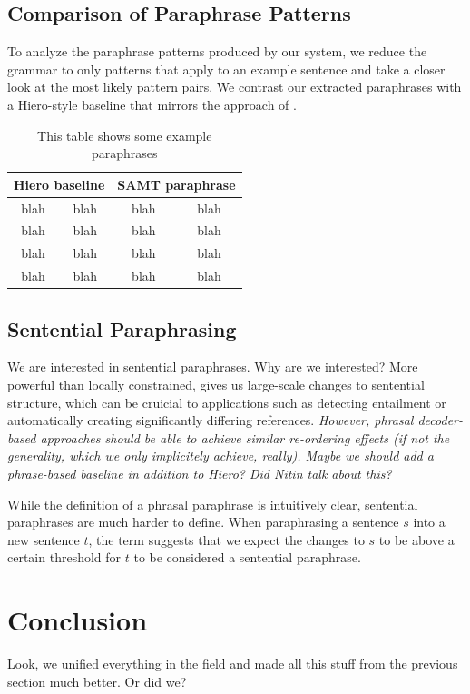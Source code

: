 \documentclass[11pt]{article}
\begin{document}
\subsection{Comparison of Paraphrase
  Patterns} \label{pattern_comparison}

To analyze the paraphrase patterns produced by our system, we reduce
the grammar to only patterns that apply to an example sentence and
take a closer look at the most likely pattern pairs. We contrast our
extracted paraphrases with a Hiero-style baseline that mirrors the
approach of . 

\begin{table}[ht]
\begin{center}
\begin{tabular}{|c|c|c|c|}
  \hline
  \multicolumn{2}{|c|}{Hiero baseline} & \multicolumn{2}{c|}{SAMT
    paraphrase} \\
  \hline
  blah & blah & blah & blah \\
  blah & blah & blah & blah \\
  blah & blah & blah & blah \\
  blah & blah & blah & blah \\
  \hline
\end{tabular}
\end{center}
\caption{This table shows some example paraphrases}
\end{table}


\subsection{Sentential Paraphrasing} \label{sentential_paraphrasing}

We are interested in sentential paraphrases. Why are we interested?
More powerful than locally constrained, gives us large-scale changes
to sentential structure, which can be cruicial to applications such as
detecting entailment or automatically creating significantly differing
references. \emph{However, phrasal decoder-based approaches should be
  able to achieve similar re-ordering effects (if not the generality,
  which we only implicitely achieve, really). Maybe we should add a
  phrase-based baseline in addition to Hiero? Did Nitin talk about
  this?}

While the definition of a phrasal paraphrase is intuitively clear,
sentential paraphrases are much harder to define. When paraphrasing a
sentence $s$ into a new sentence $t$, the term suggests that we expect
the changes to $s$ to be above a certain threshold for $t$ to be
considered a sentential paraphrase. 

\section{Conclusion} \label{conclusion}

Look, we unified everything in the field and made all this stuff from
the previous section much better. Or did we?




\nocite{*}
\end{document}
